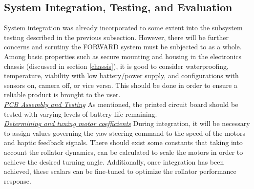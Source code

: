 \subsection{System Integration, Testing, and Evaluation}
\noindent System integration was already incorporated to some extent into the subsystem testing described in the previous subsection. However, there will be further concerns and scrutiny the FORWARD system must be subjected to as a whole. Among basic properties such as secure mounting and housing in the electronics chassis (discussed in section \ref{chassis}), it is good to consider waterproofing, temperature, viability with low battery/power supply, and configurations with sensors on, camera off, or vice versa. This should be done in order to ensure a reliable product is brought to the user.\\

\noindent \underline{\textit{PCB Assembly and Testing}}
\noindent As mentioned, the printed circuit board should be tested with varying levels of battery life remaining. \\

\noindent \underline{\textit{Determining and tuning motor coefficients}} During integration, it will be necessary to assign values governing the yaw steering command to the speed of the motors and haptic feedback signals. There should exist some constants that taking into account the rollator dynamics, can be calculated to scale the motors in order to achieve the desired turning angle. Additionally, once integration has been achieved, these scalars can be fine-tuned to optimize the rollator performance response.\\

